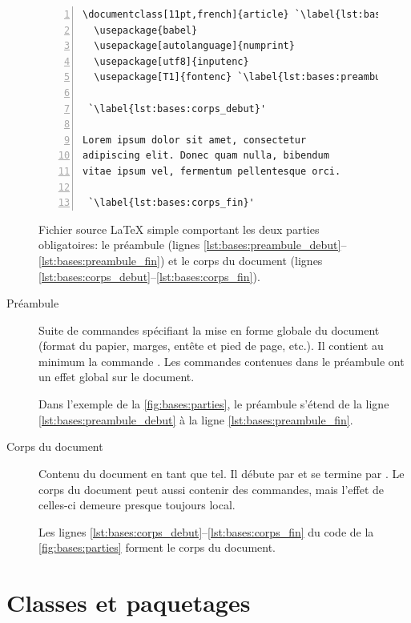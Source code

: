 \begin{figure}
  \centering
  \begin{minipage}{0.75\linewidth}
\begin{lstlisting}[numbers=left, numberstyle=\tiny,
                   frame=single, rulecolor=\color{black}, framesep=6pt]
\documentclass[11pt,french]{article} `\label{lst:bases:preambule_debut}'
  \usepackage{babel}
  \usepackage[autolanguage]{numprint}
  \usepackage[utf8]{inputenc}
  \usepackage[T1]{fontenc} `\label{lst:bases:preambule_fin}'

 `\label{lst:bases:corps_debut}'

Lorem ipsum dolor sit amet, consectetur
adipiscing elit. Donec quam nulla, bibendum
vitae ipsum vel, fermentum pellentesque orci.

 `\label{lst:bases:corps_fin}'
\end{lstlisting}
  \end{minipage}
  \caption{Fichier source {\LaTeX} simple comportant les deux parties
    obligatoires: le préambule (lignes
    \ref*{lst:bases:preambule_debut}--\ref*{lst:bases:preambule_fin})
    et le corps du document (lignes
    \ref*{lst:bases:corps_debut}--\ref*{lst:bases:corps_fin}).}
  \label{fig:bases:parties}
\end{figure}

\begin{description}
\item[Préambule] Suite de commandes spécifiant la mise en forme
  globale du document (format du papier, marges, entête et pied de
  page, etc.). Il contient au minimum la commande
  \cmd{\documentclass}. Les commandes contenues dans le préambule ont
  un effet global sur le document.

  Dans l'exemple de la \autoref{fig:bases:parties}, le préambule
  s'étend de la ligne \ref*{lst:bases:preambule_debut} à la ligne
  \ref*{lst:bases:preambule_fin}.
\item[Corps du document] Contenu du document en tant que tel.
  Il débute par \verb== et se termine par
    \verb==. Le corps du document peut aussi contenir
  des commandes, mais l'effet de celles-ci demeure presque toujours local.

  Les lignes \ref*{lst:bases:corps_debut}--\ref*{lst:bases:corps_fin}
  du code de la \autoref{fig:bases:parties} forment le corps du
  document.
\end{description}


\section{Classes et paquetages}
\label{sec:bases:classes}


